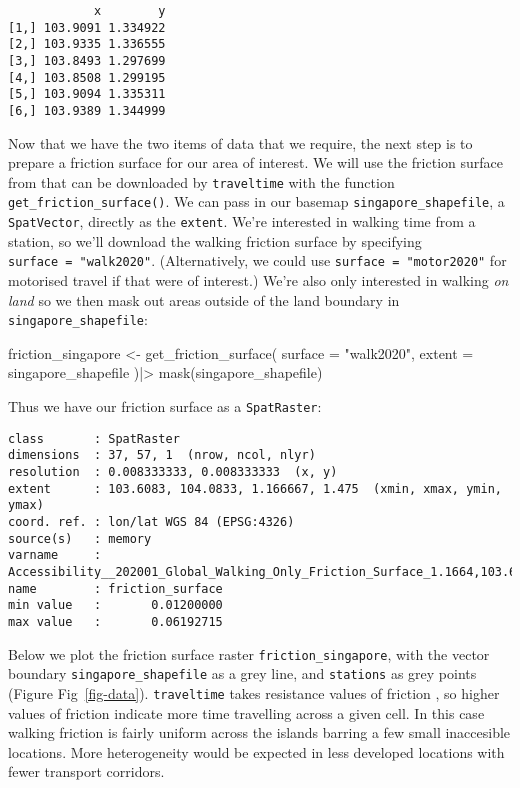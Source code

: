 \documentclass[
  10pt,
  letterpaper,
]{article}
\newenvironment{Shaded}{\begin{snugshade}}{\end{snugshade}}
\newcommand{\AttributeTok}[1]{\textcolor[rgb]{0.40,0.45,0.13}{#1}}
\newcommand{\FunctionTok}[1]{\textcolor[rgb]{0.28,0.35,0.67}{#1}}
\newcommand{\NormalTok}[1]{\textcolor[rgb]{0.00,0.23,0.31}{#1}}
\newcommand{\OtherTok}[1]{\textcolor[rgb]{0.00,0.23,0.31}{#1}}
\newcommand{\SpecialCharTok}[1]{\textcolor[rgb]{0.37,0.37,0.37}{#1}}
\newcommand{\StringTok}[1]{\textcolor[rgb]{0.13,0.47,0.30}{#1}}
\begin{document}
\begin{verbatim}
            x        y
[1,] 103.9091 1.334922
[2,] 103.9335 1.336555
[3,] 103.8493 1.297699
[4,] 103.8508 1.299195
[5,] 103.9094 1.335311
[6,] 103.9389 1.344999
\end{verbatim}

Now that we have the two items of data that we require, the next step is
to prepare a friction surface for our area of interest. We will use the
friction surface from \citet{weiss2020global} that can be downloaded by
\texttt{traveltime} with the function \texttt{get\_friction\_surface()}.
We can pass in our basemap \texttt{singapore\_shapefile}, a
\texttt{SpatVector}, directly as the \texttt{extent}. We're interested
in walking time from a station, so we'll download the walking friction
surface by specifying \texttt{surface\ =\ "walk2020"}. (Alternatively,
we could use \texttt{surface\ =\ "motor2020"} for motorised travel if
that were of interest.) We're also only interested in walking \emph{on
land} so we then mask out areas outside of the land boundary in
\texttt{singapore\_shapefile}:

\begin{Shaded}
\begin{Highlighting}[]
\NormalTok{friction\_singapore }\OtherTok{\textless{}{-}} \FunctionTok{get\_friction\_surface}\NormalTok{(}
    \AttributeTok{surface =} \StringTok{"walk2020"}\NormalTok{,}
    \AttributeTok{extent =}\NormalTok{ singapore\_shapefile}
\NormalTok{  )}\SpecialCharTok{|\textgreater{}} 
  \FunctionTok{mask}\NormalTok{(singapore\_shapefile)}
\end{Highlighting}
\end{Shaded}

Thus we have our friction surface as a \texttt{SpatRaster}:

\begin{verbatim}
class       : SpatRaster 
dimensions  : 37, 57, 1  (nrow, ncol, nlyr)
resolution  : 0.008333333, 0.008333333  (x, y)
extent      : 103.6083, 104.0833, 1.166667, 1.475  (xmin, xmax, ymin, ymax)
coord. ref. : lon/lat WGS 84 (EPSG:4326) 
source(s)   : memory
varname     : Accessibility__202001_Global_Walking_Only_Friction_Surface_1.1664,103.6091,1.4714,104.0858 
name        : friction_surface 
min value   :       0.01200000 
max value   :       0.06192715 
\end{verbatim}

Below we plot the friction surface raster \texttt{friction\_singapore},
with the vector boundary \texttt{singapore\_shapefile} as a grey line,
and \texttt{stations} as grey points (Figure Fig~\ref{fig-data}).
\texttt{traveltime} takes resistance values of friction
\citep{gdistance2017}, so higher values of friction indicate more time
travelling across a given cell. In this case walking friction is fairly
uniform across the islands barring a few small inaccesible locations.
More heterogeneity would be expected in less developed locations with
fewer transport corridors.
\end{document}
